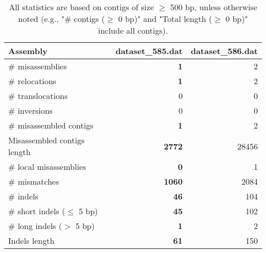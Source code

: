 \documentclass[12pt,a4paper]{article}
\begin{document}
\begin{table}[ht]
\begin{center}
\caption{All statistics are based on contigs of size $\geq$ 500 bp, unless otherwise noted (e.g., "\# contigs ($\geq$ 0 bp)" and "Total length ($\geq$ 0 bp)" include all contigs).}
\begin{tabular}{|l*{2}{|r}|}
\hline
Assembly & dataset\_585.dat & dataset\_586.dat \\ \hline
\# misassemblies & {\bf 1} & 2 \\ \hline
\hspace{5mm}\# relocations & {\bf 1} & 2 \\ \hline
\hspace{5mm}\# translocations & 0 & 0 \\ \hline
\hspace{5mm}\# inversions & 0 & 0 \\ \hline
\# misassembled contigs & {\bf 1} & 2 \\ \hline
Misassembled contigs length & {\bf 2772} & 28456 \\ \hline
\# local misassemblies & {\bf 0} & 1 \\ \hline
\# mismatches & {\bf 1060} & 2084 \\ \hline
\# indels & {\bf 46} & 104 \\ \hline
\hspace{5mm}\# short indels ($\leq$ 5 bp) & {\bf 45} & 102 \\ \hline
\hspace{5mm}\# long indels ($>$ 5 bp) & {\bf 1} & 2 \\ \hline
Indels length & {\bf 61} & 150 \\ \hline
\end{tabular}
\end{center}
\end{table}
\end{document}
